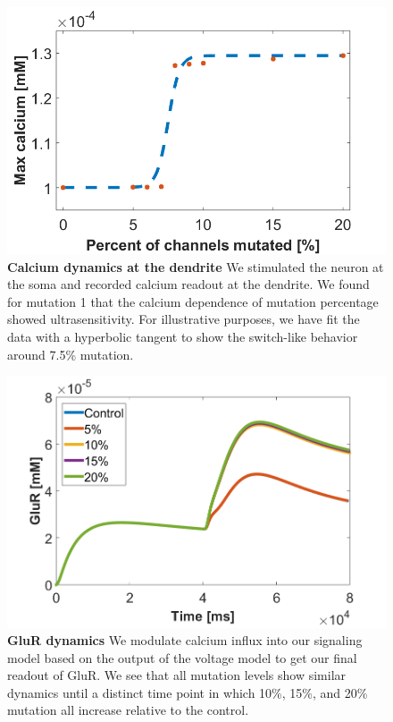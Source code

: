 \begin{figure}[!!h]
    \centering
    \includegraphics[width=1\textwidth]{images/ultraGraphSomaStim.png}
    \caption{\textbf{Calcium dynamics at the dendrite} We stimulated the neuron at the soma and
        recorded calcium readout at the dendrite. We found for mutation 1 that the calcium
        dependence of mutation percentage showed ultrasensitivity. For illustrative purposes, we
        have fit the data with a hyperbolic tangent to show the switch-like behavior around 7.5\%
        mutation.}
    \label{fig:ultra}
\end{figure}

\begin{figure}[!!h]
    \centering
    \includegraphics[width=1\textwidth]{images/GluRTimeSomaStim.png}
    \caption{\textbf{GluR dynamics} We modulate calcium influx into our signaling model based on the
        output of the voltage model to get our final readout of GluR. We see that all mutation
        levels show similar dynamics until a distinct time point in which 10\%, 15\%, and 20\%
        mutation all increase relative to the control.}
    \label{fig:GluR}
\end{figure}

